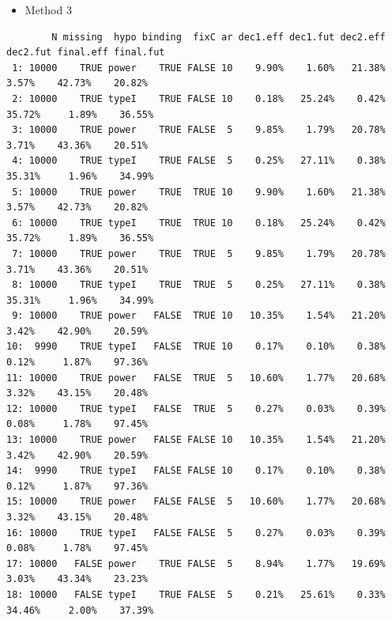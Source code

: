\documentclass[12pt]{article}
\begin{document}
\begin{itemize}
\item Method 3
\end{itemize}
\begin{verbatim}
        N missing  hypo binding  fixC ar dec1.eff dec1.fut dec2.eff dec2.fut final.eff final.fut
 1: 10000    TRUE power    TRUE FALSE 10    9.90%    1.60%   21.38%    3.57%    42.73%    20.82%
 2: 10000    TRUE typeI    TRUE FALSE 10    0.18%   25.24%    0.42%   35.72%     1.89%    36.55%
 3: 10000    TRUE power    TRUE FALSE  5    9.85%    1.79%   20.78%    3.71%    43.36%    20.51%
 4: 10000    TRUE typeI    TRUE FALSE  5    0.25%   27.11%    0.38%   35.31%     1.96%    34.99%
 5: 10000    TRUE power    TRUE  TRUE 10    9.90%    1.60%   21.38%    3.57%    42.73%    20.82%
 6: 10000    TRUE typeI    TRUE  TRUE 10    0.18%   25.24%    0.42%   35.72%     1.89%    36.55%
 7: 10000    TRUE power    TRUE  TRUE  5    9.85%    1.79%   20.78%    3.71%    43.36%    20.51%
 8: 10000    TRUE typeI    TRUE  TRUE  5    0.25%   27.11%    0.38%   35.31%     1.96%    34.99%
 9: 10000    TRUE power   FALSE  TRUE 10   10.35%    1.54%   21.20%    3.42%    42.90%    20.59%
10:  9990    TRUE typeI   FALSE  TRUE 10    0.17%    0.10%    0.38%    0.12%     1.87%    97.36%
11: 10000    TRUE power   FALSE  TRUE  5   10.60%    1.77%   20.68%    3.32%    43.15%    20.48%
12: 10000    TRUE typeI   FALSE  TRUE  5    0.27%    0.03%    0.39%    0.08%     1.78%    97.45%
13: 10000    TRUE power   FALSE FALSE 10   10.35%    1.54%   21.20%    3.42%    42.90%    20.59%
14:  9990    TRUE typeI   FALSE FALSE 10    0.17%    0.10%    0.38%    0.12%     1.87%    97.36%
15: 10000    TRUE power   FALSE FALSE  5   10.60%    1.77%   20.68%    3.32%    43.15%    20.48%
16: 10000    TRUE typeI   FALSE FALSE  5    0.27%    0.03%    0.39%    0.08%     1.78%    97.45%
17: 10000   FALSE power    TRUE FALSE  5    8.94%    1.77%   19.69%    3.03%    43.34%    23.23%
18: 10000   FALSE typeI    TRUE FALSE  5    0.21%   25.61%    0.33%   34.46%     2.00%    37.39%
\end{verbatim}
\end{document}
